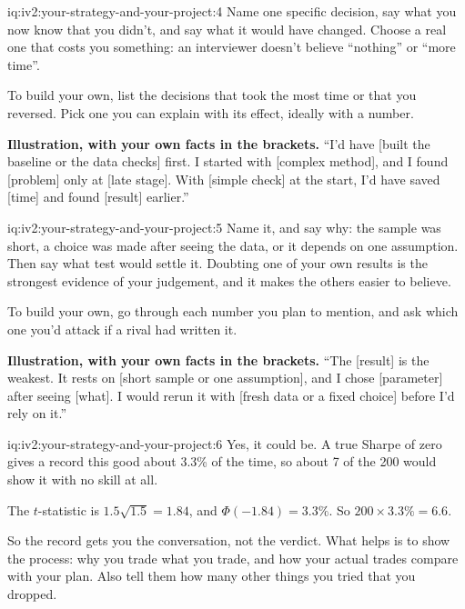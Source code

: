 \begin{solution}{iq:iv2:your-strategy-and-your-project:4}
Name one specific decision, say what you now know that you didn't, and say what it would have changed. Choose a real one that costs you something: an interviewer doesn't believe ``nothing'' or ``more time''.

To build your own, list the decisions that took the most time or that you reversed. Pick one you can explain with its effect, ideally with a number.

\textbf{Illustration, with your own facts in the brackets.} ``I'd have [built the baseline or the data checks] first. I started with [complex method], and I found [problem] only at [late stage]. With [simple check] at the start, I'd have saved [time] and found [result] earlier.''

\end{solution}

\begin{solution}{iq:iv2:your-strategy-and-your-project:5}
Name it, and say why: the sample was short, a choice was made after seeing the data, or it depends on one assumption. Then say what test would settle it. Doubting one of your own results is the strongest evidence of your judgement, and it makes the others easier to believe.

To build your own, go through each number you plan to mention, and ask which one you'd attack if a rival had written it.

\textbf{Illustration, with your own facts in the brackets.} ``The [result] is the weakest. It rests on [short sample or one assumption], and I chose [parameter] after seeing [what]. I would rerun it with [fresh data or a fixed choice] before I'd rely on it.''

\end{solution}

\begin{solution}{iq:iv2:your-strategy-and-your-project:6}
Yes, it could be. A true Sharpe of zero gives a record this good about 3.3\% of the time, so about 7 of the 200 would show it with no skill at all.

The $t$-statistic is $1.5\sqrt{1.5} = 1.84$, and $\Phi(-1.84) = 3.3\%$. So $200 \times 3.3\% = 6.6$.

So the record gets you the conversation, not the verdict. What helps is to show the process: why you trade what you trade, and how your actual trades compare with your plan. Also tell them how many other things you tried that you dropped.

\end{solution}

